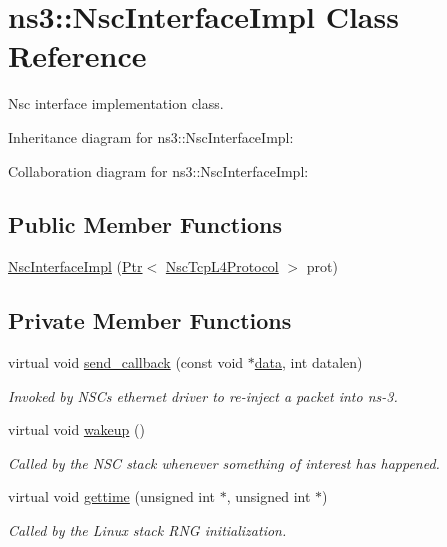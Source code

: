 \hypertarget{classns3_1_1NscInterfaceImpl}{}\section{ns3\+:\+:Nsc\+Interface\+Impl Class Reference}
\label{classns3_1_1NscInterfaceImpl}


Nsc interface implementation class.  




Inheritance diagram for ns3\+:\+:Nsc\+Interface\+Impl\+:


Collaboration diagram for ns3\+:\+:Nsc\+Interface\+Impl\+:
\subsection*{Public Member Functions}
\begin{DoxyCompactItemize}
\item 
\hyperlink{classns3_1_1NscInterfaceImpl_a709a058d14904f719c18994da101748e}{Nsc\+Interface\+Impl} (\hyperlink{classns3_1_1Ptr}{Ptr}$<$ \hyperlink{classns3_1_1NscTcpL4Protocol}{Nsc\+Tcp\+L4\+Protocol} $>$ prot)
\end{DoxyCompactItemize}
\subsection*{Private Member Functions}
\begin{DoxyCompactItemize}
\item 
virtual void \hyperlink{classns3_1_1NscInterfaceImpl_ac5f95c64b1b7babbf1b3a291d4bb3bc9}{send\+\_\+callback} (const void $\ast$\hyperlink{topology-example-sim_8cc_a26c65296e316af77b787dc77469bb2a4}{data}, int datalen)
\begin{DoxyCompactList}\small\item\em Invoked by N\+S\+Cs \textquotesingle{}ethernet driver\textquotesingle{} to re-\/inject a packet into ns-\/3. \end{DoxyCompactList}\item 
virtual void \hyperlink{classns3_1_1NscInterfaceImpl_af6f3f878f8ae81a7dbdcff1bfe73671f}{wakeup} ()
\begin{DoxyCompactList}\small\item\em Called by the N\+SC stack whenever something of interest has happened. \end{DoxyCompactList}\item 
virtual void \hyperlink{classns3_1_1NscInterfaceImpl_a54a881102994519c9704ebf78870dc75}{gettime} (unsigned int $\ast$, unsigned int $\ast$)
\begin{DoxyCompactList}\small\item\em Called by the Linux stack R\+NG initialization. \end{DoxyCompactList}\end{DoxyCompactItemize}
